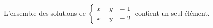 L'ensemble des solutions de $\begin{cases}x-y &= 1 \\ x+y &= 2\end{cases}$ contient un seul élément.

\begin{reponses}
\end{reponses}

